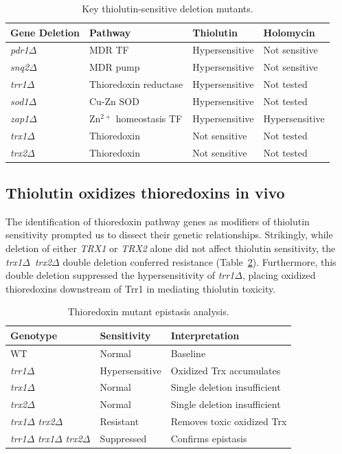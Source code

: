 \documentclass[11pt,a4paper]{article}
\begin{document}
\begin{table}[htbp]
\centering
\caption{Key thiolutin-sensitive deletion mutants.}
\label{tab:sensitive}
\small
\begin{tabular}{llll}
\toprule
\textbf{Gene Deletion} & \textbf{Pathway} & \textbf{Thiolutin} & \textbf{Holomycin} \\
\midrule
\textit{pdr1}$\Delta$ & MDR TF & Hypersensitive & Not sensitive \\
\textit{snq2}$\Delta$ & MDR pump & Hypersensitive & Not sensitive \\
\textit{trr1}$\Delta$ & Thioredoxin reductase & Hypersensitive & Not tested \\
\textit{sod1}$\Delta$ & Cu-Zn SOD & Hypersensitive & Not tested \\
\textit{zap1}$\Delta$ & Zn$^{2+}$ homeostasis TF & Hypersensitive & Hypersensitive \\
\textit{trx1}$\Delta$ & Thioredoxin & Not sensitive & Not tested \\
\textit{trx2}$\Delta$ & Thioredoxin & Not sensitive & Not tested \\
\bottomrule
\end{tabular}
\end{table}

\subsection{Thiolutin oxidizes thioredoxins in vivo}

The identification of thioredoxin pathway genes as modifiers of thiolutin sensitivity prompted us to dissect their genetic relationships. Strikingly, while deletion of either \textit{TRX1} or \textit{TRX2} alone did not affect thiolutin sensitivity, the \textit{trx1}$\Delta$~\textit{trx2}$\Delta$ double deletion conferred resistance (Table~\ref{tab:trx}). Furthermore, this double deletion suppressed the hypersensitivity of \textit{trr1}$\Delta$, placing oxidized thioredoxins downstream of Trr1 in mediating thiolutin toxicity.

\begin{table}[htbp]
\centering
\caption{Thioredoxin mutant epistasis analysis.}
\label{tab:trx}
\begin{tabular}{lll}
\toprule
\textbf{Genotype} & \textbf{Sensitivity} & \textbf{Interpretation} \\
\midrule
WT & Normal & Baseline \\
\textit{trr1}$\Delta$ & Hypersensitive & Oxidized Trx accumulates \\
\textit{trx1}$\Delta$ & Normal & Single deletion insufficient \\
\textit{trx2}$\Delta$ & Normal & Single deletion insufficient \\
\textit{trx1}$\Delta$ \textit{trx2}$\Delta$ & Resistant & Removes toxic oxidized Trx \\
\textit{trr1}$\Delta$ \textit{trx1}$\Delta$ \textit{trx2}$\Delta$ & Suppressed & Confirms epistasis \\
\bottomrule
\end{tabular}
\end{table}
\end{document}
